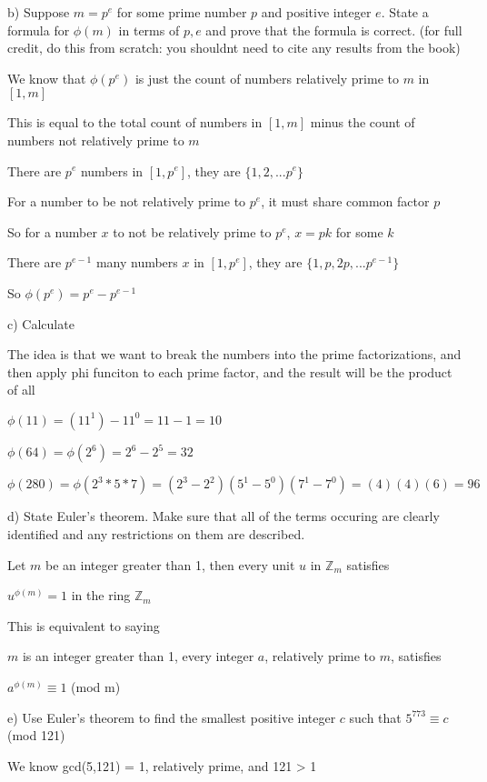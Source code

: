 \documentclass[11pt]{article}
\begin{document}
\begin{itemize}
  b) Suppose $m = p^e$ for some prime number $p$ and positive integer $e$. State a formula for $\phi(m)$ in terms of $p, e$ and prove that the formula is correct. (for full credit, do this from scratch: you shouldnt need to cite any results from the book)

  We know that $\phi(p^e)$ is just the count of numbers relatively prime to $m$ in $[1, m]$

  This is equal to the total count of numbers in $[1,m]$ minus the count of numbers not relatively prime to $m$

  There are $p^e$ numbers in $[1,p^e]$, they are $\{1,2,...p^e\}$

  For a number to be not relatively prime to $p^e$, it must share common factor $p$

  So for a number $x$ to not be relatively prime to $p^e$, $x = pk$ for some $k$

  There are $p^{e-1}$ many numbers $x$ in $[1,p^e]$, they are $\{1, p, 2p,...p^{e-1}\}$

  So $\phi(p^e) = p^e - p^{e-1}$

  c) Calculate

  The idea is that we want to break the numbers into the prime factorizations, and then apply phi funciton to each prime factor, and the result will be the product of all

  $\phi(11) = (11^1) - 11^0 = 11 - 1 = 10$

  $\phi(64) = \phi(2^6) = 2^6 - 2^5 = 32$

  $\phi(280) = \phi(2^3 * 5* 7) = (2^3 - 2^2)(5^1 - 5^0)(7^1 - 7^0) = (4)(4)(6) = 96$

  d) State Euler's theorem. Make sure that all of the terms occuring are clearly identified and any restrictions on them are described.

  Let $m$ be an integer greater than 1, then every unit $u$ in $\mathbb{Z}_m$ satisfies

  $u^{\phi(m)} = 1$ in the ring $\mathbb{Z}_m$

  This is equivalent to saying

  $m$ is an integer greater than 1, every integer $a$, relatively prime to $m$, satisfies

  $a^{\phi(m)} \equiv 1$ (mod m)

  e) Use Euler's theorem to find the smallest positive integer $c$ such that $5^{773} \equiv c$ (mod 121)

  We know gcd(5,121) = 1, relatively prime, and 121 > 1


\end{itemize}
\end{document}
